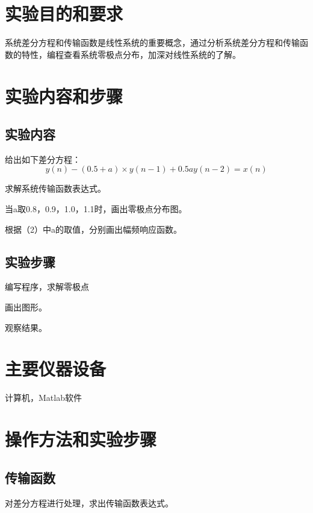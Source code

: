 \documentclass{zjureport}
\begin{document}
\thispagestyle{empty}

\makeCover


\section{实验目的和要求}
  系统差分方程和传输函数是线性系统的重要概念，通过分析系统差分方程和传输函数的特性，编程查看系统零极点分布，加深对线性系统的了解。
\section{实验内容和步骤}

  \subsection{实验内容}

    给出如下差分方程：
    $$y(n) - (0.5+a)\times y(n-1) + 0.5ay(n-2) = x(n)$$
    \begin{clause}
      \item 求解系统传输函数表达式。
      \item 当a取0.8，0.9，1.0，1.1时，画出零极点分布图。
      \item 根据（2）中a的取值，分别画出幅频响应函数。
    \end{clause}

  \subsection{实验步骤}
    \begin{clause}
      \item 编写程序，求解零极点
      \item 画出图形。
      \item 观察结果。
    \end{clause}

\section{主要仪器设备}
  计算机，Matlab软件

\section{操作方法和实验步骤}
  \subsection{传输函数}
    对差分方程进行处理，求出传输函数表达式。
\end{document}
